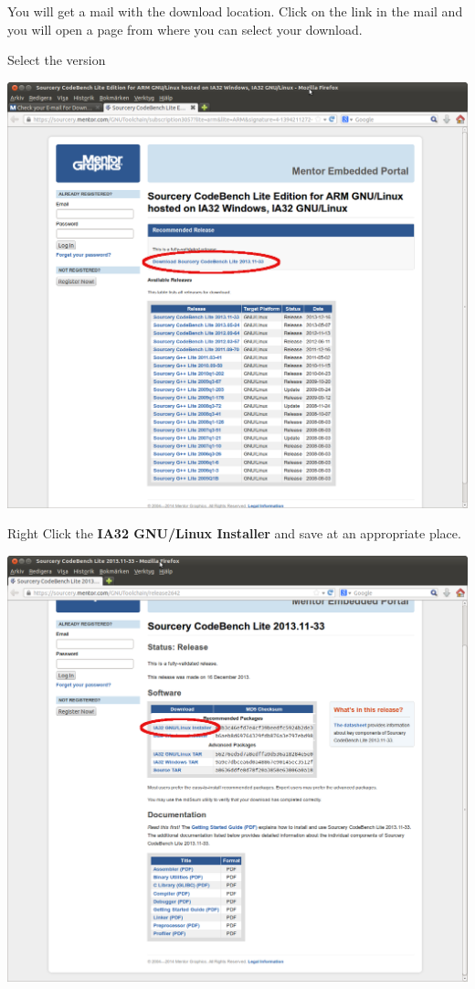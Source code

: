 You will get a mail with the download location.
Click on the link in the mail and you will open a page from where
you can select your download.
\clearpage

Select the \codesourcery version


\begin{center}
  \includegraphics[width=\textwidth]{labs/setup-codesourcery/Codebench_Lite_2013_11.png}
\end{center}
\clearpage

Right Click the {\bf IA32 GNU/Linux Installer} and save at an appropriate place.

\begin{center}
  \includegraphics[width=\textwidth]{labs/setup-codesourcery/Codebench_Lite_2013_11_Gnu-Linux.png}
\end{center}

